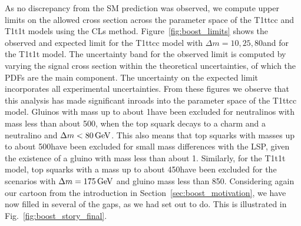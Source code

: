 As no discrepancy from the SM prediction was observed, we compute upper limits on the allowed
cross section across the parameter space of the T1ttcc and T1t1t models using the CLs method.
Figure~\ref{fig:boost_limits} shows the observed and expected limit for the T1ttcc model with
$\Delta m=10,25,80$\GeV and for the T1t1t model. 
The uncertainty band for the observed limit is computed by varying the signal cross section within
the theoretical uncertainties, of which the PDFs are the main component. The uncertainty on the
expected limit incorporates all experimental uncertainties. 
From these figures we observe that this analysis has made significant inroads into the parameter
space of the T1ttcc model. 
Gluinos with mass up to about 1\TeV have been excluded for neutralinos with mass less than about
500\GeV, when the top squark decays to a charm and a neutralino and $\Delta m < 80\,\text{Ge\hspace{-.08em}V}$. This also
means that top squarks with masses up to about 500\GeV have been excluded for small mass
differences with the LSP, given the existence of a gluino with mass less than about 1\TeV. 
Similarly, for the T1t1t model, top squarks with a mass up to about 450\GeV have been excluded
for the scenarios with $\Delta m = 175\,\text{Ge\hspace{-.08em}V}$ and gluino mass less than 850\GeV.
Considering again our cartoon from the introduction in Section~\ref{sec:boost_motivation}, we have
now filled in several of the gaps, as we had set out to do. This is illustrated in
Fig.~\ref{fig:boost_story_final}. 


